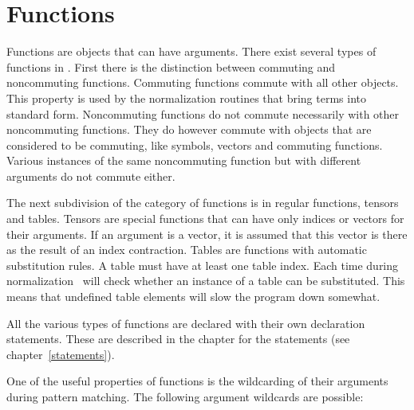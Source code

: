 
\chapter{Functions}
\label{functions}


\noindent Functions are objects that can have arguments. 
There exist several types of functions in \FORM. First there is the 
distinction between commuting and 
noncommuting functions. Commuting functions commute 
with all other objects. This property is used by the normalization routines 
that bring terms into standard form. Noncommuting functions do not commute 
necessarily with other noncommuting functions. They do however commute with 
objects that are considered to be commuting, like symbols, vectors and 
commuting functions. Various instances of the same noncommuting function 
but with different arguments do not commute either.

\noindent The next subdivision of the category of functions is in regular 
functions, tensors and 
tables. Tensors are special functions that can have only 
indices or vectors for their arguments. If an argument is a vector, it is 
assumed that this vector is there as the result of an index contraction. 
Tables are functions with automatic substitution rules. A table must have 
at least one table index. Each time 
during normalization \FORM\ will check whether an instance of a table can be 
substituted. This means that undefined table elements will slow the program 
down somewhat.

\noindent All the various types of functions are declared with their own 
declaration statements. These are described in the chapter for the 
statements (see chapter~\ref{statements}).


One of the useful properties of functions is the 
wildcarding of their arguments during pattern matching. The 
following argument wildcards are possible:



